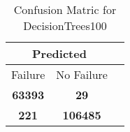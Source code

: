 \begin{table}[] 
\caption{Confusion Matric for DecisionTrees100} 
\label{Table: Prediction Accuracy-NoneDecisionTrees100100.0EKF-ignoresolarPanelDipole-solarPanelDipole} 
\centering 
\begin{tabular} 
 {@{}ccc@{}} 
\toprule 
\multicolumn{2}{c}{\textbf{Predicted}}
 \\ \midrule 
\multicolumn{1}{|c|}{Failure} & 
\multicolumn{1}{c|}{No Failure}
 \\ \midrule 
\multicolumn{1}{|c|}{\color{green}\textbf{63393}} & 
\multicolumn{1}{c|}{\color{red}\textbf{29}}
 \\ \midrule 
\multicolumn{1}{|c|}{\color{red}\textbf{221}} & 
\multicolumn{1}{c|}{\color{green}\textbf{106485}}
 \\ \bottomrule 
\end{tabular} 
\end{table} 
